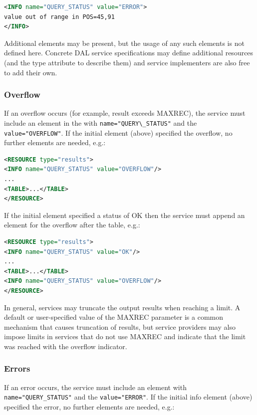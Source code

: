 \documentclass[11pt,letter]{ivoa}
\begin{document}
\begin{lstlisting}[language=XML]
<INFO name="QUERY_STATUS" value="ERROR">
value out of range in POS=45,91
</INFO>
\end{lstlisting}

Additional  elements may be present, but the usage of any such elements 
is not defined here. Concrete DAL service specifications may define additional 
resources (and the type attribute to describe them) and service implementers are 
also free to add their own. 

\subsubsection{Overflow}
\label{sec:response-overflow}
If an overflow occurs (for example, result exceeds MAXREC), the service must include an 
element in the  with \verb|name="QUERY\_STATUS"| and the 
\verb|value="OVERFLOW"|. If 
the initial  element (above) specified the overflow, no further elements are 
needed, e.g.:

\begin{lstlisting}[language=XML]
<RESOURCE type="results">
<INFO name="QUERY_STATUS" value="OVERFLOW"/>
...
<TABLE>...</TABLE>
</RESOURCE>
\end{lstlisting}

If the initial  element specified a status of OK then the service must 
append an  element for the overflow after the table, e.g.:

\begin{lstlisting}[language=XML]
<RESOURCE type="results">
<INFO name="QUERY_STATUS" value="OK"/>
...
<TABLE>...</TABLE>
<INFO name="QUERY_STATUS" value="OVERFLOW"/>
</RESOURCE>
\end{lstlisting}

In general, services may truncate the output results when reaching a limit. A default or
user-specified value of the MAXREC parameter is a common mechanism that causes truncation
of results, but service providers may also impose limits in services that do not use 
MAXREC and indicate that the limit was reached with the overflow indicator.


\subsubsection{Errors}
\label{sect:errors}

If an error occurs, the service must include an  element with 
\verb|name="QUERY_STATUS"| and the \verb|value="ERROR"|. If the initial info element (above) 
specified the error, no further elements are needed, e.g.:
\end{document}
